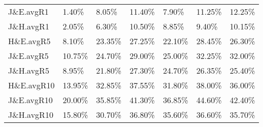 \begin{table}
\begin{tabular}{l|llllll}
J\&E.avgR1   &                1.40\% &                     8.05\% &                  11.40\% &         7.90\% &              11.25\% &              12.25\% \\
J\&H.avgR1   &                2.05\% &                     6.30\% &                  10.50\% &         8.85\% &               9.40\% &              10.15\% \\
\midrule
H\&E.avgR5   &                8.10\% &                    23.35\% &                  27.25\% &        22.10\% &              28.45\% &              26.30\% \\
J\&E.avgR5   &               10.75\% &                    24.70\% &                  29.00\% &        25.00\% &              32.25\% &              32.00\% \\
J\&H.avgR5   &                8.95\% &                    21.80\% &                  27.30\% &        24.70\% &              26.35\% &              25.40\% \\
\midrule
H\&E.avgR10  &               13.95\% &                    32.85\% &                  37.55\% &        31.80\% &              38.00\% &              36.00\% \\
J\&E.avgR10  &               20.00\% &                    35.85\% &                  41.30\% &        36.85\% &              44.60\% &              42.40\% \\
J\&H.avgR10  &               15.80\% &                    30.70\% &                  36.80\% &        35.60\% &              36.60\% &              35.70\% \\
\bottomrule
\end{tabular}



\end{table}
